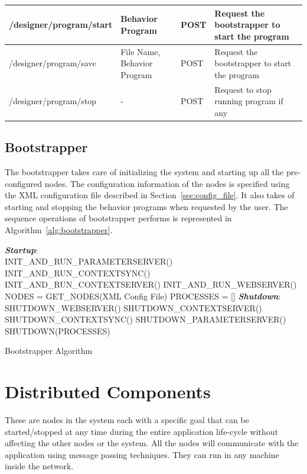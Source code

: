 \begin{table}[H]
\begin{tabular}{|l|p{2.8cm}|p{1.2cm}|p{5.5cm}|}
  /designer/program/start & Behavior Program & POST  & Request the bootstrapper to start the program
  										                    \tabularnewline\hline   

  /designer/program/save & File Name, Behavior Program & POST  & Request the bootstrapper to start the program
                                          \tabularnewline\hline 
  /designer/program/stop & - & POST  & Request to stop running program if any
                                          \tabularnewline\hline
\end{tabular}
\end{table}

\subsection*{Bootstrapper} 
The bootstrapper takes care of initializing the system and starting up all the pre-configured nodes. The configuration information of the nodes is specified using the XML configuration file described in Section~\ref{sec:config_file}. It also takes of starting and stopping the behavior programs when requested by the user. The sequence operations of bootstrapper performs is represented in Algorithm~\ref{alg:bootstrapper}.

\begin{algorithm}[H]
 \textbf{\emph{Startup}}:\\
 \quad INIT\_AND\_RUN\_PARAMETERSERVER()\;
 \quad INIT\_AND\_RUN\_CONTEXTSYNC()\;
 \quad INIT\_AND\_RUN\_CONTEXTSERVER()\;
 \quad INIT\_AND\_RUN\_WEBSERVER()\;
 \quad NODES = GET\_NODES(XML Config File)\;
 \quad PROCESSES = []\;
 \textbf{\emph{Shutdown}}:\\
 \quad SHUTDOWN\_WEBSERVER()\; 
 \quad SHUTDOWN\_CONTEXTSERVER()\;
 \quad SHUTDOWN\_CONTEXTSYNC()\;
 \quad SHUTDOWN\_PARAMETERSERVER()\;
 \quad SHUTDOWN(PROCESSES)
 \caption{Bootstrapper Algorithm}
 \label{alg:bootstrapper}
\end{algorithm}
\section{Distributed Components}
\label{ssec:dist_comp}
These are nodes in the system each with a specific goal that can be started/stopped at any time during the entire application life-cycle without affecting the other nodes or the system. All the nodes will communicate with the application using message passing techniques. They can run in any machine inside the network.

